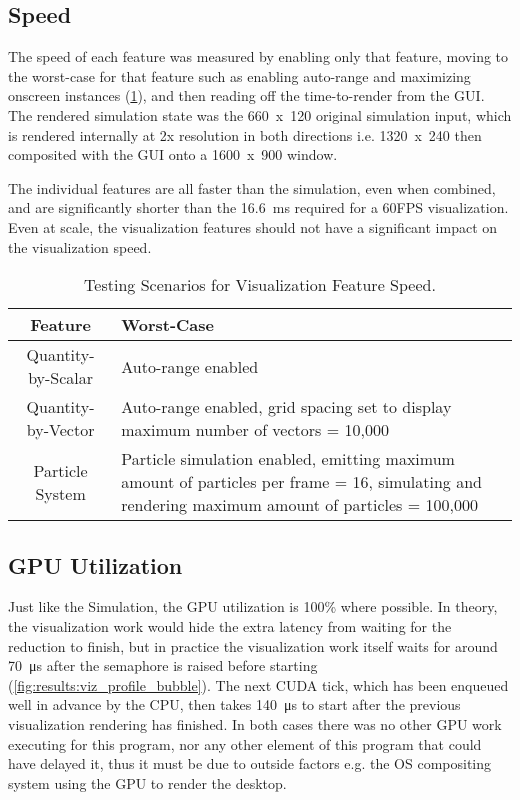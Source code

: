 \subsection{Speed}\label{sec:Results:Viz:Speed}
The speed of each feature was measured by enabling only that feature, moving to the worst-case for that feature such as enabling auto-range and maximizing onscreen instances (\cref{tab:results:vizworstcases}), and then reading off the time-to-render from the GUI.
The rendered simulation state was the 660~x~120 original simulation input, which is rendered internally at 2x resolution in both directions i.e. 1320~x~240 then composited with the GUI onto a 1600~x~900 window.

The individual features are all faster than the simulation, even when combined, and are significantly shorter than the \SI{16.6}{\milli\second} required for a 60FPS visualization.
Even at scale, the visualization features should not have a significant impact on the visualization speed.

\begin{table}
    \centering
    \begin{tabular}{c|p{}}
        Feature & Worst-Case \\
        \hline
        Quantity-by-Scalar & Auto-range enabled \\
        Quantity-by-Vector & Auto-range enabled, grid spacing set to display maximum number of vectors = 10,000 \\
        Particle System & Particle simulation enabled, emitting maximum amount of particles per frame = 16, simulating and rendering maximum amount of particles = 100,000 \\
    \end{tabular}
    \caption{Testing Scenarios for Visualization Feature Speed.}
    \label{tab:results:vizworstcases}
\end{table}



\subsection{GPU Utilization}\label{sec:Results:Viz:Efficiency}

Just like the Simulation, the GPU utilization is 100\% where possible.
In theory, the visualization work would hide the extra latency from waiting for the reduction to finish, but in practice the visualization work itself waits for around \SI{70}{\micro\second} after the semaphore is raised before starting (\cref{fig:results:viz_profile_bubble}).
The next CUDA tick, which has been enqueued well in advance by the CPU, then takes \SI{140}{\micro\second} to start after the previous visualization rendering has finished.
In both cases there was no other GPU work executing for this program, nor any other element of this program that could have delayed it, thus it must be due to outside factors e.g. the OS compositing system using the GPU to render the desktop.


